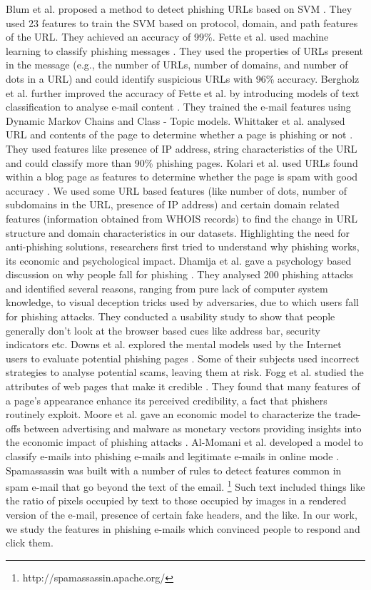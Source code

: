 \documentclass[conference]{IEEEtran}
\begin{document}
Blum et al. proposed a method to detect phishing URLs based on SVM \cite{blum}. They used 23 features to train the SVM based on protocol, domain, and path features of the URL. They achieved an accuracy of 99\%. Fette et al. used machine learning to classify phishing messages \cite{fette}. They used the properties of URLs present in the message (e.g., the number of URLs, number of domains, and number of dots in a URL) and could identify suspicious URLs with 96\% accuracy. Bergholz et al. further improved the accuracy of Fette et al. by introducing models of text classiﬁcation to analyse e-mail content \cite{bergholz}. They trained the e-mail features using Dynamic Markov Chains and Class - Topic models. Whittaker et al. analysed URL and contents of the page to determine whether a page is phishing or not \cite{colin}. They used features like presence of IP address, string characteristics of the URL and could classify more than 90\% phishing pages. Kolari et al. used URLs found within a blog page as features to determine whether the page is spam with good accuracy \cite{kolari}. We used some URL based features (like number of dots, number of subdomains in the URL, presence of IP address) and certain domain related features (information obtained from WHOIS records) to find the change in URL structure and domain characteristics in our datasets.
\newline\indent
Highlighting the need for anti-phishing solutions, researchers first tried to understand why phishing works, its economic and psychological impact. Dhamija et al. gave a psychology based discussion on why people fall for phishing \cite{dhamija}. They analysed 200 phishing attacks and identified several reasons, ranging from pure lack of computer system knowledge, to visual deception tricks used by adversaries, due to which users fall for phishing attacks. They conducted a usability study to show that people generally don't look at the browser based cues like address bar, security indicators etc. Downs et al. explored the mental models used by the Internet users to evaluate potential phishing pages \cite{downs}. Some of their subjects used incorrect strategies to analyse potential scams, leaving them at risk. Fogg et al. studied the attributes of web pages that make it credible \cite{fogg}. They found that many features of a page's appearance enhance its perceived credibility, a fact that phishers routinely exploit. Moore et al. gave an economic model to characterize the trade-offs between advertising and malware as monetary vectors providing insights into the economic impact of phishing attacks \cite{moore}. Al-Momani et al. developed a model to classify e-mails into phishing e-mails and legitimate e-mails in online mode \cite{momani}. Spamassassin was built with a number of rules to detect features common in spam e-mail that go beyond the text of the email. \footnote{http://spamassassin.apache.org/} Such text included things like the ratio of pixels occupied by text to those occupied by images in a rendered version of the e-mail, presence of certain fake headers, and the like. In our work, we study the features in phishing e-mails which convinced people to respond and click them.
\end{document}
